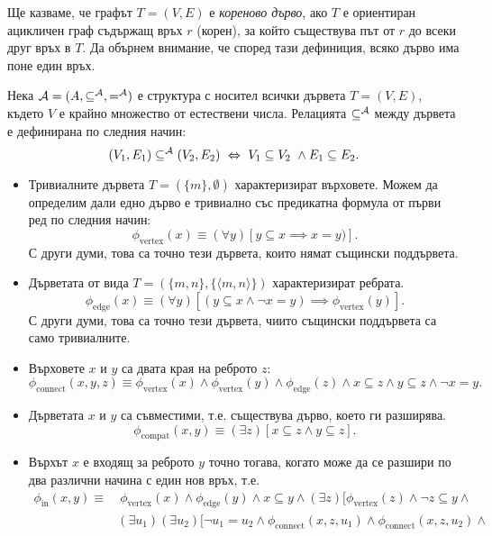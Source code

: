 \begin{example}
  Ще казваме, че графът $T = (V,E)$ е \emph{кореново дърво}, ако $T$ е ориентиран ацикличен граф съдържащ връх $r$ (корен), за който
  съществува път от $r$ до всеки друг връх в $T$. 
  Да обърнем внимание, че според тази дефиниция, всяко дърво има поне един връх.
  
  Нека $\mathcal{A} = (A,\subseteq^{\mathcal{A}}, =^{\mathcal{A}})$ е структура с носител всички дървета $T = (V,E)$, където $V$ е крайно множество от естествени числа.
  Релацията $\subseteq^{\mathcal{A}}$ между дървета е дефинирана по следния начин:
  \[(V_1,E_1) \subseteq^{\mathcal{A}} (V_2,E_2) \ \Leftrightarrow\  V_1 \subseteq V_2\ \land E_1 \subseteq E_2.\]
  \begin{itemize}
  \item
    Тривиалните дървета $T = (\{m\},\emptyset)$ характеризират върховете. Можем да определим дали едно дърво е тривиално със предикатна формула от първи ред по
    следния начин:
    \[\phi_{\text{vertex}}(x) \equiv (\forall y)[y \subseteq x \implies x = y)].\]
    С други думи, това са точно тези дървета, които нямат същински поддървета.
  \item
    Дърветата от вида $T = (\{m,n\}, \{\langle m,n \rangle\})$ характеризират ребрата.
    \[\phi_{\text{edge}}(x) \equiv (\forall y)[(y \subseteq x \land \neg x = y) \implies \phi_{\text{vertex}}(y)].\]
    С други думи, това са точно тези дървета, чиито същински поддървета са само тривиалните.
  \item
    Върховете $x$ и $y$ са двата края на реброто $z$:
    \[\phi_{\text{connect}}(x,y,z) \equiv \phi_{\text{vertex}}(x) \land \phi_{\text{vertex}}(y) \land \phi_{\text{edge}}(z) \land x \subseteq z \land y \subseteq z \land \neg x = y.\]
  \item
    Дърветата $x$ и $y$ са съвместими, т.е. съществува дърво, което ги разширява.
    \[\phi_{\text{compat}}(x,y) \equiv (\exists z)[x \subseteq z \land y \subseteq z].\]
  \item
    Върхът $x$ е входящ за реброто $y$ точно тогава, когато може да се разшири по два различни начина с един нов връх, т.е.
    \begin{align*}
      \phi_{\text{in}}(x,y) \equiv &\ \phi_{\text{vertex}}(x) \land \phi_{\text{edge}}(y) \land x \subseteq y \land (\exists z)[\phi_{\text{vertex}}(z) \land \neg z \subseteq y \land \\
                                & (\exists u_1)(\exists u_2)[\neg u_1 = u_2 \land \phi_{\text{connect}}(x,z,u_1) \land \phi_{\text{connect}}(x,z,u_2) \land \\

\end{align*}
\end{itemize}
\end{example}
